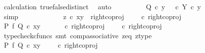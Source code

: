 \begin{isabellebody}
\ calculation\ true{\isacharunderscore}{\kern0pt}false{\isacharunderscore}{\kern0pt}distinct\ \isamarkupfalse%
\ auto\isanewline
\ \ \ \ \ \ \isamarkupfalse%
\ \isamarkupfalse%
\ {\isachardoublequoteopen}Q\ {\isasymcirc}\isactrlsub c\ y\ {\isacharequal}{\kern0pt}\ {\isacharparenleft}{\kern0pt}{\isasymt}\ {\isasymcirc}\isactrlsub c\ {\isasymbeta}\isactrlbsub Y\isactrlesub {\isacharparenright}{\kern0pt}\ {\isasymcirc}\isactrlsub c\ y{\isachardoublequoteclose}\isanewline
\ \ \ \ \ \ \ \ \isamarkupfalse%
\ simp\isanewline
\ \ \ \ \isamarkupfalse%
\isanewline
\ \ \ \ \ \ \isamarkupfalse%
\ {\isachardoublequoteopen}z\ {\isasymcirc}\isactrlsub c\ {\isasymlangle}x{\isacharcomma}{\kern0pt}y{\isasymrangle}\ {\isacharequal}{\kern0pt}\ right{\isacharunderscore}{\kern0pt}coproj\ {\isasymone}\ {\isacharparenleft}{\kern0pt}{\isasymone}\ {\isasymCoprod}\ {\isasymone}{\isacharparenright}{\kern0pt}\ {\isasymcirc}\isactrlsub c\ right{\isacharunderscore}{\kern0pt}coproj\ {\isasymone}\ {\isasymone}{\isachardoublequoteclose}\isanewline
\ \ \ \ \ \ \isamarkupfalse%
\ \isamarkupfalse%
\ {\isachardoublequoteopen}{\isacharparenleft}{\kern0pt}P\ {\isasymtimes}\isactrlsub f\ Q{\isacharparenright}{\kern0pt}\ {\isasymcirc}\isactrlsub c\ {\isasymlangle}x{\isacharcomma}{\kern0pt}y{\isasymrangle}\ {\isacharequal}{\kern0pt}\ {\isacharparenleft}{\kern0pt}{\isasymlangle}{\isasymt}{\isacharcomma}{\kern0pt}{\isasymt}{\isasymrangle}\ {\isasymamalg}\ {\isasymlangle}{\isasymf}{\isacharcomma}{\kern0pt}{\isasymf}{\isasymrangle}\ {\isasymamalg}\ {\isasymlangle}{\isasymf}{\isacharcomma}{\kern0pt}{\isasymt}{\isasymrangle}{\isacharparenright}{\kern0pt}\ {\isasymcirc}\isactrlsub c\ right{\isacharunderscore}{\kern0pt}coproj\ {\isasymone}\ {\isacharparenleft}{\kern0pt}{\isasymone}\ {\isasymCoprod}\ {\isasymone}{\isacharparenright}{\kern0pt}\ {\isasymcirc}\isactrlsub c\ right{\isacharunderscore}{\kern0pt}coproj\ {\isasymone}\ {\isasymone}{\isachardoublequoteclose}\isanewline
\ \ \ \ \ \ \ \ \isamarkupfalse%
\ {\isacharparenleft}{\kern0pt}typecheck{\isacharunderscore}{\kern0pt}cfuncs{\isacharcomma}{\kern0pt}\ smt\ comp{\isacharunderscore}{\kern0pt}associative{}\ z{\isacharunderscore}{\kern0pt}eq\ z{\isacharunderscore}{\kern0pt}type{\isacharparenright}{\kern0pt}\isanewline
\ \ \ \ \ \ \isamarkupfalse%
\ \isamarkupfalse%
\ {\isachardoublequoteopen}{\isacharparenleft}{\kern0pt}P\ {\isasymtimes}\isactrlsub f\ Q{\isacharparenright}{\kern0pt}\ {\isasymcirc}\isactrlsub c\ {\isasymlangle}x{\isacharcomma}{\kern0pt}y{\isasymrangle}\ {\isacharequal}{\kern0pt}\ {\isacharparenleft}{\kern0pt}{\isasymlangle}{\isasymf}{\isacharcomma}{\kern0pt}{\isasymf}{\isasymrangle}\ {\isasymamalg}\ {\isasymlangle}{\isasymf}{\isacharcomma}{\kern0pt}{\isasymt}{\isasymrangle}{\isacharparenright}{\kern0pt}\ {\isasymcirc}\isactrlsub c\ right{\isacharunderscore}{\kern0pt}coproj\ {\isasymone}\ {\isasymone}{\isachardoublequoteclose}\isanewline

\end{isabellebody}
